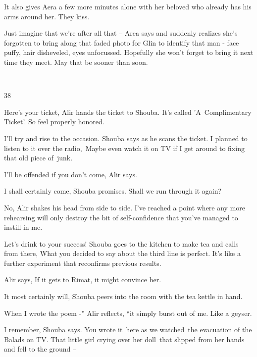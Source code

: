 \documentclass[twoside,11pt]{book}
\begin{document}
It also gives Aera a few more minutes alone with her beloved who already has his arms around her. They kiss. \ 

{\textquotedbl}Just imagine that we're after all that --{\textquotedbl} Area says and suddenly realizes she's forgotten
to bring along that faded photo for Glin to identify that man - face puffy, hair disheveled, eyes unfocussed. Hopefully
she won't forget to bring it next time they meet. May that be sooner than soon.

~

38 

{\textquotedbl}Here's your ticket,{\textquotedbl} Alir hands the ticket to Shouba. {\textquotedbl}It's called
'A\ Complimentary Ticket'. So feel properly honored.{\textquotedbl} 

{\textquotedbl}I'll try and rise to the occasion.{\textquotedbl} Shouba says as he scans the ticket. {\textquotedbl}I
planned to listen to it over the radio,\ Maybe even watch it on TV if I get around to fixing that old piece
of~junk.{\textquotedbl} 

{\textquotedbl}I'll be offended if you don't come,{\textquotedbl} Alir says. 

{\textquotedbl}I shall certainly come,{\textquotedbl} Shouba promises. {\textquotedbl}Shall we run through it
again?{\textquotedbl} 

{\textquotedbl}No,{\textquotedbl} Alir shakes his head from side to side. {\textquotedbl}I've reached a point where any
more rehearsing will only destroy the bit of self-confidence that you{}'ve managed to instill in me.{\textquotedbl} 

{\textquotedbl}Let's drink to your success!{\textquotedbl} Shouba goes to the kitchen to make tea and calls from there,
{\textquotedbl}What you decided to say about the third line is perfect. It's like a further experiment that reconfirms
previous results.{\textquotedbl} 

Alir says, {\textquotedbl}If it gets to Rimat, it might convince her.{\textquotedbl} 

{\textquotedbl}It most certainly will,{\textquotedbl} Shouba peers into the room with the tea kettle in hand. 

{\textquotedbl}When I wrote the poem -{}'' Alir reflects, ``it simply burst out of me. Like a geyser.{\textquotedbl} 

{\textquotedbl}I remember,{\textquotedbl} Shouba says. {\textquotedbl}You wrote it~here as we watched~the evacuation of
the Balads on TV. That little girl crying over her doll~that slipped from her hands and fell to the ground
--{\textquotedbl} 
\end{document}
